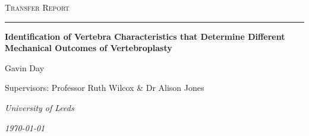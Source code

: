 \begin{titlepage}

\center


\textsc{\Large Transfer Report}\\[0.5cm]
\hrule
\vspace{3cm}

{\LARGE \textbf{Identification of Vertebra Characteristics that Determine Different Mechanical Outcomes of Vertebroplasty}\par}  %

 \vspace{5cm}

Gavin Day

\vspace{0.5cm}

Supervisors: Professor Ruth Wilcox \& Dr Alison Jones


\vspace{7cm}

\textit{University of Leeds}

\textit{\today}
\vfill

\end{titlepage}

\tableofcontents
\listoffigures
\listoftables

\pagebreak